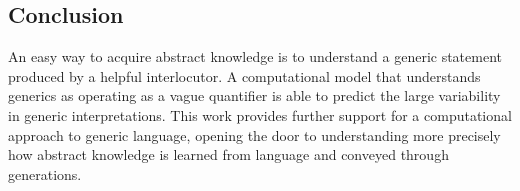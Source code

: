 \documentclass[floatsintext,doc]{apa6}
\begin{document}
\hypertarget{conclusion}{%
\subsection{Conclusion}\label{conclusion}}

An easy way to acquire abstract knowledge is to understand a generic statement produced by a helpful interlocutor. 
A computational model that understands generics as operating as a vague quantifier is able to predict the large variability in generic interpretations.
This work provides further support for a computational approach to generic language, opening the door to understanding more precisely how abstract knowledge is learned from language and conveyed through generations.

\newpage



\end{document}
